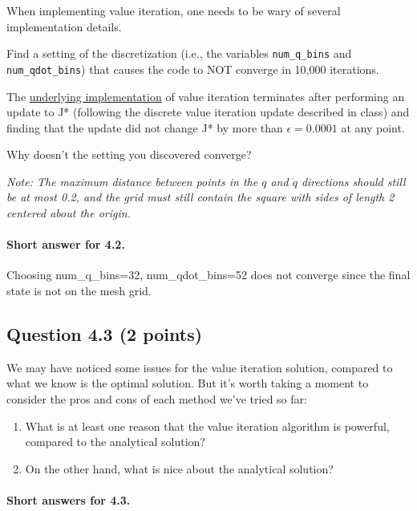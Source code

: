 \documentclass[11pt]{article}
\begin{document}
When implementing value iteration, one needs to be wary of several
implementation details.

Find a setting of the discretization (i.e., the variables
\texttt{num\_q\_bins} and \texttt{num\_qdot\_bins}) that causes the code
to NOT converge in 10,000 iterations.

The
\href{https://github.com/RobotLocomotion/drake/blob/master/systems/controllers/dynamic_programming.cc}{underlying
implementation} of value iteration terminates after performing an update
to J* (following the discrete value iteration update described in class)
and finding that the update did not change J* by more than
\(\epsilon = 0.0001\) at any point.

Why doesn't the setting you discovered converge?

\emph{Note: The maximum distance between points in the \(q\) and
\(\dot{q}\) directions should still be at most 0.2, and the grid must
still contain the square with sides of length 2 centered about the
origin.}

    \paragraph{Short answer for 4.2.}\label{short-answer-for-4.2.}

Choosing num\_q\_bins=32, num\_qdot\_bins=52 does not converge since the
final state is not on the mesh grid.

    \subsection{Question 4.3 (2 points)}\label{question-4.3-2-points}

We may have noticed some issues for the value iteration solution,
compared to what we know is the optimal solution. But it's worth taking
a moment to consider the pros and cons of each method we've tried so
far:

\begin{enumerate}
\def\labelenumi{\alph{enumi})}
\item
  What is at least one reason that the value iteration algorithm is
  powerful, compared to the analytical solution?
\item
  On the other hand, what is nice about the analytical solution?
\end{enumerate}

    \paragraph{Short answers for 4.3.}\label{short-answers-for-4.3.}
\end{document}
